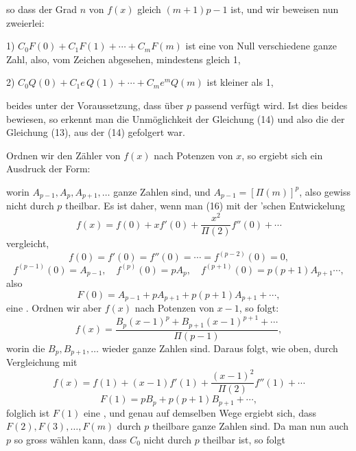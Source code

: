 so dass der Grad $n$ von $f(x)$ gleich $(m+1)p-1$ ist, und wir beweisen nun zweierlei:

1) $C_0 F(0) + C_1 F(1) + \cdots + C_m F(m)$ ist eine von Null verschiedene ganze Zahl, also, vom Zeichen abgesehen, mindestens gleich 1,

2) $C_0 Q(0) + C_1 e\,Q(1) + \cdots + C_m e^m Q(m)$ ist kleiner als 1,

beides unter der Voraussetzung, dass über $p$ passend verfügt wird. Ist dies beides bewiesen, so erkennt man die Unmöglichkeit der Gleichung (14) und also die der Gleichung (13), aus der (14) gefolgert war.

Ordnen wir den Zähler von $f(x)$ nach Potenzen von $x$, so ergiebt sich ein Ausdruck der Form:


worin $A_{p-1}, A_p, A_{p+1}, \ldots$ ganze Zahlen sind, und $A_{p-1}=[\Pi(m)]^p$, also gewiss nicht durch $p$ theilbar. Es ist daher, wenn man (16) mit der 'schen Entwickelung
\[
f(x) = f(0) + xf'(0) + \frac{x^2}{\Pi(2)}f''(0)+\cdots
\]
vergleicht,
\[
f(0)=f'(0)=f''(0)=\cdots=f^{(p-2)}(0)=0,
\]
\[
f^{(p-1)}(0)=A_{p-1},\quad f^{(p)}(0)=pA_p,\quad f^{(p+1)}(0)=p(p+1)A_{p+1}\cdots,
\]
also
\[
F(0) = A_{p-1}+pA_{p+1}+p(p+1)A_{p+1}+\cdots, %
\]
eine . Ordnen wir aber $f(x)$ nach Potenzen von $x-1$, so folgt:
\[
f(x) = \frac{B_p(x-1)^p+B_{p+1}(x-1)^{p+1}+\cdots}{\Pi(p-1)},
\]
worin die $B_p, B_{p+1}, \ldots$ wieder ganze Zahlen sind. Daraus folgt, wie oben, durch Vergleichung mit
\[
f(x) = f(1) + (x-1)f'(1) + \frac{(x-1)^2}{\Pi(2)}f''(1)+\cdots
\]
\[
F(1) = pB_p + p(p+1)B_{p+1}+\cdots,
\]
folglich ist $F(1)$ eine , und genau auf demselben Wege ergiebt sich, dass $F(2), F(3), \ldots, F(m)$ durch $p$ theilbare ganze Zahlen sind. Da man nun auch $p$ so gross wählen kann, dass $C_0$ nicht durch $p$ theilbar ist, so folgt
